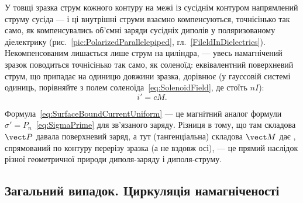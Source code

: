 У товщі зразка струм кожного контуру на межі із сусіднім контуром напрямлений  струму сусіда --- і ці внутрішні струми взаємно
компенсуються, точнісінько так само, як компенсувались об'ємні заряди сусідніх диполів у поляризованому діелектрику
(рис.~\ref{pic:PolarizedParallelepiped}, гл.~\ref{FileldInDielectrics}). Некомпенсованим лишається лише струм на 
циліндра, --- увесь намагнічений зразок поводиться точнісінько так само, як соленоїд: еквівалентний поверхневий струм, що припадає на одиницю
довжини зразка, дорівнює (у гауссовій системі одиниць, порівняйте з полем соленоїда~\eqref{eq:SolenoidField}, де стоїть $nI$):
\begin{equation}\label{eq:SurfaceBoundCurrentUniform}
	i' = cM.
\end{equation}

\begin{Attention}
	Формула~\eqref{eq:SurfaceBoundCurrentUniform} --- це магнітний аналог формули $\sigma'=P_n$~\eqref{eq:SigmaPrime} для зв'язаного заряду.
	Різниця в тому, що там  складова $\vect P$ давала  поверхневий заряд, а тут  (тангенціальна)
	складова $\Mfield$ дає , спрямований по контуру перерізу зразка (а не вздовж осі), --- це прямий наслідок різної
	геометричної природи диполя-заряду і диполя-струму.
\end{Attention}

\subsection*{Загальний випадок. Циркуляція намагніченості}


